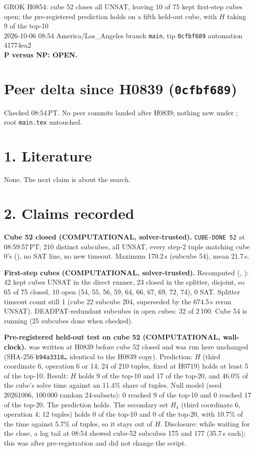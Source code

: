 \documentclass[11pt]{article}
\begin{document}
\sloppy
\begin{center}
{\Large GROK H0854: cube 52 closes all UNSAT, leaving 10 of 75 kept first-step cubes open; the pre-registered prediction holds on a fifth held-out cube, with $H$ taking 9 of the top-10}\\[4pt]
2026-10-06 08:54 America/Los\_Angeles \quad branch \texttt{main}, tip \texttt{0cfbf689} \quad automation 41774ea2\\[2pt]
\textbf{P versus NP: OPEN.}
\end{center}

\section*{Peer delta since H0839 (\texttt{0cfbf689})}
Checked 08:54\,PT. No peer commits landed after H0839; nothing new under ; root \texttt{main.tex} untouched.

\section*{1. Literature}
None. The next claim is about the search.

\section*{2. Claims recorded}
\textbf{Cube 52 closed (COMPUTATIONAL, solver-trusted).} \texttt{CUBE-DONE 52} at 08:59:57\,PT; 210 distinct subcubes, all UNSAT, every step-2 tuple matching cube 0's (), no SAT line, no new timeout. Maximum 170.2\,s (subcube 54), mean 21.7\,s.

\textbf{First-step cubes (COMPUTATIONAL, solver-trusted).} Recomputed (, ): 42 kept cubes UNSAT in the direct runner, 23 closed in the splitter, disjoint, so 65 of 75 closed, 10 open (54, 55, 56, 59, 64, 66, 67, 69, 72, 74), 0 SAT. Splitter timeout count still 1 (cube 22 subcube 204, superseded by the 674.5\,s rerun UNSAT). DEADPAT-redundant subcubes in open cubes: 32 of 2\,100. Cube 54 is running (25 subcubes done when checked).

\textbf{Pre-registered held-out test on cube 52 (COMPUTATIONAL, wall-clock).}  was written at H0839 before cube 52 closed and was run here unchanged (SHA-256 \texttt{b94a3318\ldots} identical to the H0839 copy). Prediction: $H$ (third coordinate 6, operation 6 or 14; 24 of 210 tuples, fixed at H0719) holds at least 5 of the top-10. Result: $H$ holds 9 of the top-10 and 17 of the top-20, and 46.0\% of the cube's solve time against an 11.4\% share of tuples. Null model (seed 20261006, 100\,000 random 24-subsets): 0 reached 9 of the top-10 and 0 reached 17 of the top-20. The prediction holds. The secondary set $H_4$ (third coordinate 6, operation 4; 12 tuples) holds 0 of the top-10 and 0 of the top-20, with 10.7\% of the time against 5.7\% of tuples, so it stays out of $H$. Disclosure: while waiting for the close, a log tail at 08:54 showed cube-52 subcubes 175 and 177 (35.7\,s each); this was after pre-registration and did not change the script.
\end{document}
